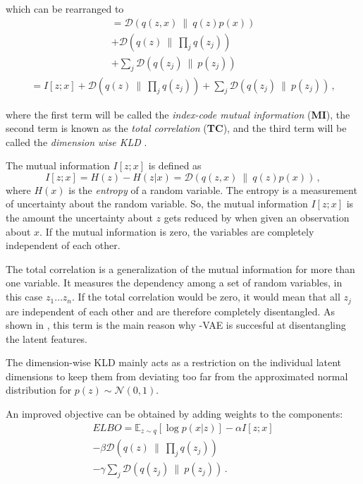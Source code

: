 \documentclass[a4paper]{IEEEtran}
\begin{document}
{which can be rearranged to 
\begin{align*}
	= \mathcal{D}(q(z, x) \ \| \ q(z)p(x)) \\ + \mathcal{D}(q(z) \ \| \  \prod_{j} q(z_j)) \\ + \sum_j \mathcal{D}(q(z_j) \ \| \ p(z_j))
\end{align*}
\begin{align*}
	= I[z;x] + \mathcal{D}(q(z) \ \| \  \prod_{j} q(z_j)) + \sum_j \mathcal{D}(q(z_j) \ \| \ p(z_j)) \,,
\end{align*}

where the first term will be called the \textit{index-code mutual information} (\textbf{MI}), the second term is known as the \textit{total correlation} (\textbf{TC}), and the third term will be called the \textit{dimension wise KLD} \cite{chen2019isolating}.

The mutual information $I\left[ z; x \right]$ is defined as
\begin{equation}
	I[z;x] = H(z) - H(z|x) = \mathcal{D}(q(z, x) \ \| \ q(z)p(x))\,,
\end{equation}
where $H(x)$ is the \textit{entropy} of a random variable. The entropy is a measurement of uncertainty about the random variable. So, the mutual information $I[z;x]$ is the amount the uncertainty about $z$ gets reduced by when given an observation about $x$. If the mutual information is zero, the variables are completely independent of each other.

The total correlation is a generalization of the mutual information for more than one variable. It measures the dependency among a set of random variables, in this case $z_1 \ldots z_n$. If the total correlation would be zero, it would mean that all $z_j$ are independent of each other and are therefore completely disentangled. As shown in \cite{chen2019isolating}, this term is the main reason why \textbeta -VAE is succesful at disentangling the latent features.

The dimension-wise KLD mainly acts as a restriction on the individual latent dimensions to keep them from deviating too far from the approximated normal distribution for $p(z) \sim \mathcal{N}(0,1)$.

An improved objective can be obtained by adding weights to the components:
\begin{align*}
	ELBO = \mathbb{E}_{z \sim q}\left[ \log p(x|z) \right] - \alpha I[z;x] \\ - \beta \mathcal{D}(q(z) \ \| \  \prod_{j} q(z_j)) \\ - \gamma \sum_j \mathcal{D}(q(z_j) \ \| \ p(z_j))\,.
\end{align*}

}
\end{document}
